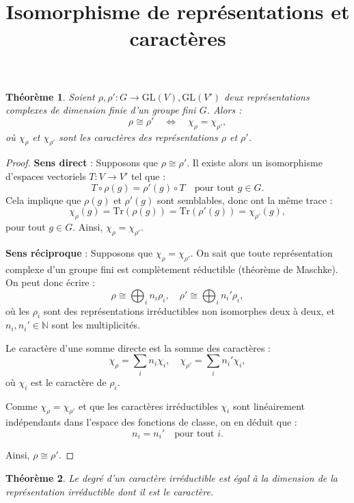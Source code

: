 \documentclass[12pt]{article}
\title{Isomorphisme de représentations et caractères}
\author{}
\date{}
\newtheorem{theoreme}{Théorème}
\begin{document}
	
	\maketitle
	
	\begin{theoreme}
		Soient \( \rho, \rho' : G \to \mathrm{GL}(V), \mathrm{GL}(V') \) deux représentations complexes de dimension finie d’un groupe fini \( G \). Alors :
		\[
		\rho \cong \rho' \quad \Leftrightarrow \quad \chi_\rho = \chi_{\rho'},
		\]
		où \( \chi_\rho \) et \( \chi_{\rho'} \) sont les caractères des représentations \( \rho \) et \( \rho' \).
	\end{theoreme}
	
	\begin{proof}
		\textbf{Sens direct} : Supposons que \( \rho \cong \rho' \). Il existe alors un isomorphisme d’espaces vectoriels \( T : V \to V' \) tel que :
		\[
		T \circ \rho(g) = \rho'(g) \circ T \quad \text{pour tout } g \in G.
		\]
		Cela implique que \( \rho(g) \) et \( \rho'(g) \) sont semblables, donc ont la même trace :
		\[
		\chi_\rho(g) = \mathrm{Tr}(\rho(g)) = \mathrm{Tr}(\rho'(g)) = \chi_{\rho'}(g),
		\]
		pour tout \( g \in G \). Ainsi, \( \chi_\rho = \chi_{\rho'} \).
		
		\vspace{1em}
		\textbf{Sens réciproque} : Supposons que \( \chi_\rho = \chi_{\rho'} \). On sait que toute représentation complexe d’un groupe fini est complètement réductible (théorème de Maschke). On peut donc écrire :
		\[
		\rho \cong \bigoplus_{i} n_i \rho_i, \quad \rho' \cong \bigoplus_{i} n_i' \rho_i,
		\]
		où les \( \rho_i \) sont des représentations irréductibles non isomorphes deux à deux, et \( n_i, n_i' \in \mathbb{N} \) sont les multiplicités.
		
		Le caractère d’une somme directe est la somme des caractères :
		\[
		\chi_\rho = \sum_i n_i \chi_i, \quad \chi_{\rho'} = \sum_i n_i' \chi_i,
		\]
		où \( \chi_i \) est le caractère de \( \rho_i \).
		
		Comme \( \chi_\rho = \chi_{\rho'} \) et que les caractères irréductibles \( \chi_i \) sont linéairement indépendants dans l’espace des fonctions de classe, on en déduit que :
		\[
		n_i = n_i' \quad \text{pour tout } i.
		\]
		
		Ainsi, \( \rho \cong \rho' \).
		
	\end{proof}
	
	
	\newpage
	
	
	\begin{theoreme}
		Le degré d’un caractère irréductible est égal à la dimension de la représentation irréductible dont il est le caractère.
	\end{theoreme}
	
\end{document}
